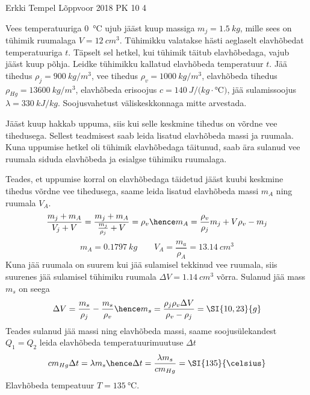 {Erkki Tempel} %
{Lõppvoor} %
{2018} %
{PK 10} %
{4} %
{
\ifStatement
Vees temperatuuriga \SI{0}{\celsius} ujub jääst kuup massiga $m_j=\SI{1,5}{kg}$, mille sees on tühimik ruumalaga $V=\SI{12}{cm^3}$. Tühimikku valatakse hästi aeglaselt elavhõbedat temperatuuriga $t$. Täpselt sel hetkel, kui tühimik täitub elavhõbedaga, vajub jääst kuup põhja. Leidke tühimikku kallatud elavhõbeda temperatuur $t$. Jää tihedus $\rho_j=\SI{900}{kg/m^3}$, vee tihedus $\rho_v=\SI{1000}{kg/m^3}$, elavhõbeda tihedus $\rho_{Hg}=\SI{13600}{kg/m^3}$, elavhõbeda erisoojus $c=\SI{140}{J/(kg\cdot\celsius)}$, jää sulamissoojus $\lambda=\SI{330}{kJ/kg}$. Soojusvahetust väliskeskkonnaga mitte arvestada.
\fi


\ifHint
Jääst kuup hakkab uppuma, siis kui selle keskmine tihedus on võrdne vee tihedusega. Sellest teadmisest saab leida lisatud elavhõbeda massi ja ruumala. Kuna uppumise hetkel oli tühimik elavhõbedaga täitunud, saab ära sulanud vee ruumala siduda elavhõbeda ja esialgse tühimiku ruumalaga.
\fi


\ifSolution
Teades, et uppumise korral on elavhõbedaga täidetud jääst kuubi keskmine tihedus võrdne vee tihedusega, saame leida lisatud elavhõbeda massi $m_A$ ning ruumala $V_A$.\\
\[ \frac{m_j + m_A}{V_j + V} = \frac{m_j + m_A}{\frac{m_j}{\rho_j} + V} = \rho_v \hence m_A = \frac{\rho_v}{\rho_j}m_j + V\rho_v - m_j  \]
\[ m_A = \SI{0,1797}{kg}\quad\quad V_A = \frac{m_a}{\rho_A} = \SI{13,14}{cm^3} \]
Kuna jää ruumala on suurem kui jää sulamisel tekkinud vee ruumala, siis suurenes jää sulamisel tühimiku ruumala $\Delta V = \SI{1,14}{cm^3}$ võrra. Sulanud jää mass $m_s$ on seega
\[ \Delta V = \frac{m_s}{\rho_j} - \frac{m_s}{\rho_v}\hence m_s = \frac{\rho_j\rho_v\Delta V}{\rho_v - \rho_j} = \SI{10,23}{g} \] 
Teades sulanud jää massi ning elavhõbeda massi, saame soojusülekandest $Q_1 = Q_2$ leida elavhõbeda temperatuurimuutuse $\Delta t$
\[ cm_{Hg}\Delta t = \lambda m_s\hence \Delta t =  \frac{\lambda m_s}{cm_{Hg}} = \SI{135}{\celsius} \]
Elavhõbeda tempeatuur $T =\SI{135}{\celsius}$.
\fi
}